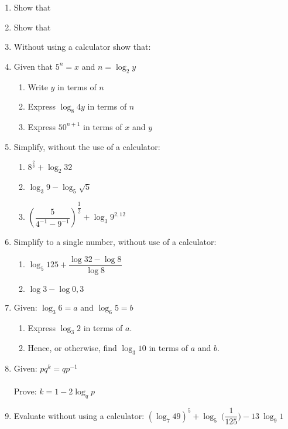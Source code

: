 \begin{eocexercises}{}
\begin{enumerate}
\item{Show that
}
\item{Show that
}
\item{Without using a calculator show that:
}
\item{Given that $5^n=x$ and $n=\log_2y$
\begin{enumerate}
\item Write $y$ in terms of $n$
\item Express $\log_8 4y$ in terms of $n$
\item Express $50^{n+1}$ in terms of $x$ and $y$
\end{enumerate}}

\item{Simplify, without the use of a calculator:
\begin{enumerate}
\item{$8^{\frac{2}{3}}+\log_2 32$}
\item{$\log_3 9 - \log_5 \sqrt{5}$}
\item{$\left(\dfrac{5}{4^{-1}-9^{-1}}\right)^{\dfrac{1}{2}}+\log_3 9^{2,12}$}
\end{enumerate}}
\item{Simplify to a single number, without use of a calculator:
\begin{enumerate}
\item{$\log_5 125 + \dfrac{\log 32-\log 8}{\log 8}$}
\item{$\log 3 - \log 0,3$}
\end{enumerate}}
\item{Given: \quad $\log_3 6 = a$ and $\log_6 5 = b$
\begin{enumerate}
\item{Express $\log_3 2$ in terms of $a$.}
\item{Hence, or otherwise, find $\log_3 10$ in terms of $a$ and $b$.}
\end{enumerate}}

\item{Given: \quad $pq^k = qp^{-1}$ \\ \\ Prove: \quad $k = 1 - 2\log_q p$}

\item{Evaluate without using a calculator: $(\log_{ 7} 49)^5 + \log_{ 5} \: \biggl(\dfrac{1}{125}\biggr) - 13\:\log_{ 9} 1$}


\end{enumerate}
\end{eocexercises}

